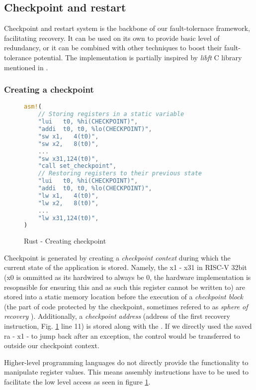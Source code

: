 \subsection{Checkpoint and restart}

Checkpoint and restart system is the backbone of our fault-tolernace framework, facilitating recovery. It can be used on its own to provide basic level of redundancy, or it can be combined with other techniques to boost their fault-tolerance potential. The implementation is partially inspired by \textit{libft} C library mentioned in \cite{libft}.

\subsubsection{Creating a checkpoint} \label{sec:creating_checkpoint}

\begin{figure}[!h]
\begin{lstlisting}[language=Rust]
asm!(
    // Storing registers in a static variable
    "lui   t0, %hi(CHECKPOINT)",
    "addi  t0, t0, %lo(CHECKPOINT)",
    "sw x1,   4(t0)",
    "sw x2,   8(t0)",
    ...
    "sw x31,124(t0)",
    "call set_checkpoint",
    // Restoring registers to their previous state
    "lui   t0, %hi(CHECKPOINT)",
    "addi  t0, t0, %lo(CHECKPOINT)",
    "lw x1,   4(t0)",
    "lw x2,   8(t0)",
    ...
    "lw x31,124(t0)",
)
\end{lstlisting}
\caption{Rust - Creating checkpoint}
\label{fig:rust_create_checkpoint}
\end{figure}

Checkpoint is generated by creating a \textit{checkpoint context} during which the current state of the application is stored. Namely, the  x1 - x31 in RISC-V 32bit (x0 is ommitted as its hardwired to always be 0, the hardware implementation is resopnsible for ensuring this and as such this register cannot be written to) are stored into a static memory location before the execution of a \textit{checkpoint block} (the part of code protected by the checkpoint, sometimes refered to as \textit{sphere of recovery} \cite{shubu}). Additionally, a \textit{checkpoint address} (address of the first recovery instruction, Fig. \ref{fig:rust_create_checkpoint} line 11) is stored along with the . If we directly used the saved \acrfull{ra} - x1 - to jump back after an exception, the control would be transferred to outside our checkpoint context.

Higher-level programming languages do not directly provide the functionality to manipulate register values. This means assembly instructions have to be used to facilitate the low level access as seen in figure \ref{fig:rust_create_checkpoint}.

